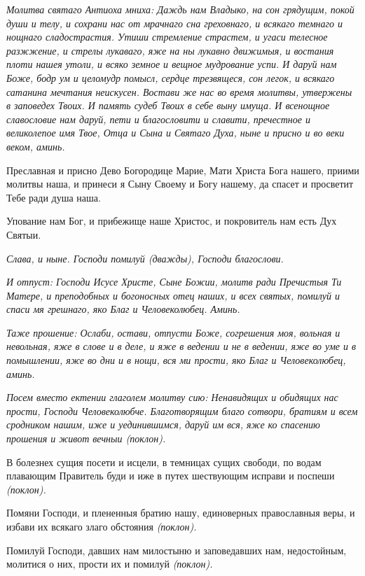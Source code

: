  \itshape Молитва святаго Антиоха мниха:\normalfont{} Даждь нам Владыко, на сон грядущим,
покой души и телу, и сохрани нас от мрачнаго сна греховнаго, и всякаго
темнаго и нощнаго сладострастия. Утиши стремление страстем, и
угаси телесное разжжение, и стрелы лукаваго, яже на ны лукавно
движимыя, и востания плоти нашея утоли, и всяко земное и вещное
мудрование успи. И даруй нам Боже, бодр ум и целомудр помысл,
сердце трезвящеся, сон легок, и всякаго сатанина мечтания неискусен.
Востави же нас во время молитвы, утвержены в заповедех Твоих. И
память судеб Твоих в себе выну имуща. И всенощное славословие нам
даруй, пети и благословити и славити, пречестное и великолепое имя
Твое, Отца и Сына и Святаго Духа, ныне и присно и во веки веком,
аминь.


   Преславная и присно Дево Богородице Марие, Мати Христа Бога нашего,
приими молитвы наша, и принеси я Сыну Своему и Богу нашему, да спасет и
просветит Тебе ради душа наша.


   Упование нам Бог, и прибежище наше Христос, и покровитель нам есть
Дух Святыи.


 \itshape Слава, и ныне\normalfont{}. Господи помилуй \itshape (дважды)\normalfont{}, Господи благослови.


 \itshape И отпуст:\normalfont{} Господи Исусе Христе, Сыне Божии, молитв ради Пречистыя
Ти Матере, и преподобных и богоносных отец наших, и всех святых, помилуй
и спаси мя грешнаго, яко Благ и Человеколюбец. Аминь.


 \itshape Таже прошение:\normalfont{} Ослаби, остави, отпусти Боже, согрешения моя, вольная
и невольная, яже в слове и в деле, и яже в ведении и не в ведении, яже во
уме и в помышлении, яже во дни и в нощи, вся ми прости, яко Благ и
Человеколюбец, аминь.


 \itshape Посем вместо ектении глаголем молитву сию:\normalfont{} Ненавидящих и обидящих
нас прости, Господи Человеколюбче. Благотворящим благо сотвори, братиям
и всем сродником нашим, иже и уединившимся, даруй им вся, яже ко
спасению прошения и живот вечныи \itshape (поклон)\normalfont{}.


   В болезнех сущия посети и исцели, в темницах сущих свободи, по водам
плавающим Правитель буди и иже в путех шествующим исправи и поспеши
\itshape (поклон)\normalfont{}.


   Помяни Господи, и плененныя братию нашу, единоверных православныя
веры, и избави их всякаго злаго обстояния \itshape (поклон)\normalfont{}.


   Помилуй Господи, давших нам милостыню и заповедавших нам,
недостойным, молитися о них, прости их и помилуй \itshape (поклон)\normalfont{}.


